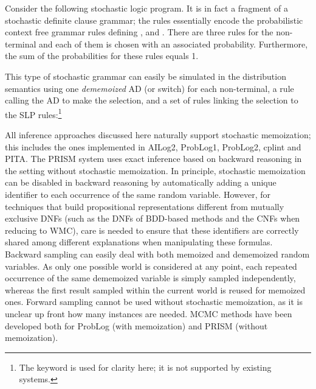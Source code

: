 \documentclass[a4paper]{article}
\begin{document}
Consider the following stochastic logic program. It is in fact a fragment of a stochastic definite clause
grammar;  the rules essentially encode the probabilistic context free grammar rules defining , 
 and . There are three rules for the non-terminal 
and each of them is chosen with an associated probability. Furthermore, the sum of the probabilities for these rules equals 1.



This type of stochastic grammar can easily be simulated in the distribution semantics using 
one {\em dememoized} AD (or switch) for each  non-terminal, a rule
calling the AD to 
make the selection, and a set of rules linking the selection to the
SLP rules:\footnote{The
   keyword is used for clarity here; it is not
  supported by existing systems.}




All inference approaches discussed here naturally support stochastic memoization; this
includes the ones implemented in 
AILog2, ProbLog1, ProbLog2, cplint and PITA. The PRISM system uses
exact inference based on backward reasoning in the setting without
stochastic memoization. In principle, stochastic memoization can be
disabled in backward reasoning by automatically adding a unique identifier to each occurrence of
the same random variable. However, for techniques that
build propositional representations different from mutually exclusive DNFs (such as the DNFs of BDD-based methods and the
CNFs when reducing to WMC), care is needed to ensure that these
identifiers are correctly shared among different explanations when
manipulating these formulas. 
Backward sampling can easily deal with both memoized and dememoized
random variables. As only one possible world is considered at any
point, each repeated occurrence of the same dememoized variable is
simply sampled independently, whereas the first result sampled within
the current world is reused for memoized ones. 
Forward sampling cannot be used without stochastic memoization, as it is
unclear up front how many instances are needed. 
MCMC methods have been developed both for ProbLog (with memoization)
and PRISM (without memoization). 
\end{document}
